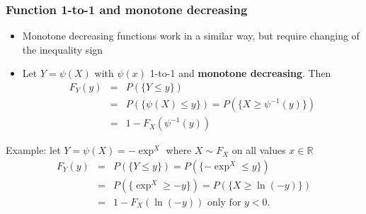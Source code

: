 \documentclass[notes=show,smaller,handout]{beamer}\usepackage[]{graphicx}\usepackage[]{color}
\renewcommand{\Pr}{P}
\newenvironment{stepitemize}{\begin{itemize}[<+->]}{\end{itemize} }
\begin{document}
\begin{frame}%

\frametitle{Function 1-to-1 and monotone decreasing}

\begin{stepitemize}
\item Monotone decreasing functions work in a similar way, but require
changing of the inequality sign

\item Let $Y=\psi \left( X\right) $ with $\psi \left( x\right) $ 1-to-1 and
\textbf{monotone decreasing}. Then
\begin{eqnarray*}
F_{Y}\left( y\right) &=&\Pr \left( \{ Y\leq y \} \right) \\
&=&\Pr \left( \{ \psi \left( X\right) \leq y \} \right) =\Pr \left( \{ X\geq \psi
^{-1}\left( y\right) \} \right) \\
&=&1-F_{X}\left( \psi ^{-1}\left( y\right) \right)
\end{eqnarray*}

\end{stepitemize}
\begin{example}
Example: let $Y=\psi \left( X\right) =-\exp^ X $ where $%
X\sim F_X$ on all values $x\in
\mathbb{R}
$%
\begin{eqnarray*}
F_{Y}\left( y\right) &=&\Pr \left( \{ Y\leq y \}\right) =\Pr \left( \{ -\exp ^
X \leq y \} \right) \\
&=&\Pr \left( \{ \exp^ X \geq -y \} \right) =\Pr \left( \{ X\geq \ln
\left( -y\right) \} \right) \\
&=&1-F_{X}\left( \ln \left( -y\right) \right) \text{ only for }y<0\text{.}
\end{eqnarray*}
\end{example}


\end{frame}%
\end{document}
